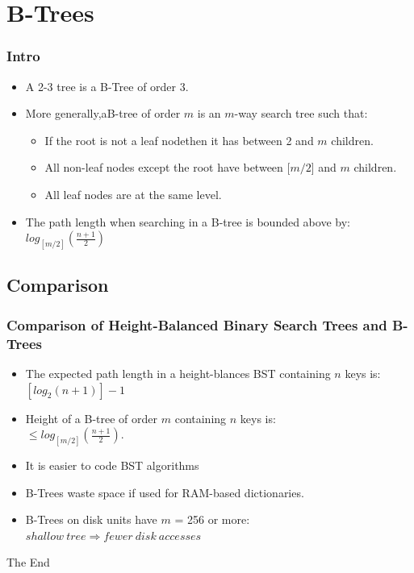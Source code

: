 \documentclass{beamer}
\begin{document}
\section{B-Trees}
\begin{frame}
\frametitle{Intro}
\begin{itemize}
\item A 2-3 tree is a B-Tree of {\color{red} order 3}.
\item More generally,a{\color{green}B-tree of order $m$} is an $m$-way search tree such that:
\begin{itemize}
\item If the root is not a leaf nodethen it has between 2 and $m$ children.
\item All non-leaf nodes except the root have between [$m/2$] and $m$ children.
\item All leaf nodes are at the same level.
\end{itemize}
\item The path length when searching in a B-tree is bounded above by:\\
$log_{[m/2]}(\frac{n+1}{2})$
\end{itemize}
\end{frame}
\subsection{Comparison}
\begin{frame}
\frametitle{Comparison of Height-Balanced Binary Search Trees and B-Trees}
\begin{itemize}
\item The expected path length  in a height-blances BST containing $n$ keys is:\\
$[log_2(n+1)] - 1$
\item Height of a B-tree of order $m$ containing $n$ keys is:\\
$\leq log_{[m/2]}(\frac{n+1}{2})$.
\item It is easier to code BST algorithms
\item B-Trees waste space if used for RAM-based dictionaries.
\item B-Trees on disk units have $m$ = 256 or more:\\
$shallow \ tree \Rightarrow fewer \ disk \ accesses$
\end{itemize}
\end{frame}

\begin{frame} 
\Huge{\centerline{The End}}
\end{frame}
\end{document}
